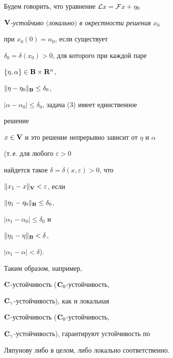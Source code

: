\begin{defn}


Будем говорить, что уравнение ${\cal L}x={\cal F}x+\eta_0$\;


{\it $\bold {V}$-устойчиво $($локально$)$ в окрестности решения $x_0$}


при $x_0(0)=\alpha_0$, если существует


$\delta_0=\delta(x_0)>0$, для которого при каждой паре


$\{\eta,\alpha\}\in\bold {B}\times\bold {R}^n$,


$\|\eta-\eta_0\|_{\bold B}\le\delta_0$,


$|\alpha-\alpha_0|\le\delta_0$, задача (3) имеет единственное


решение


$x\in\bold {V}$ и это решение непрерывно зависит от $\eta$ и $\alpha$


(т.\,е. для любого $\varepsilon>0$


найдется такое $\delta=\delta(x,\varepsilon)>0$, что


$\|x_1-x\|_{\bold V}<\varepsilon$, если


$\|\eta_1-\eta_0\|_{\bold B}\le\delta_0$,


$|\alpha_1-\alpha_0|\le\delta_0$ и


$\|\eta_1-\eta\|_{\bold B}<\delta$,


$|\alpha_1-\alpha|<\delta$).


\end{defn}





\begin{note}


Таким образом, например,


$\bold {C}$-устойчивость ($\bold {C}_0$-устойчивость,


$\bold {C}_\gamma$-устой\-чи\-вость), как и локальная


$\bold {C}$-устойчивость ($\bold {C}_0$-устойчивость,


$\bold {C}_\gamma$-устойчивость), гарантируют устойчивость по


Ляпунову либо в целом, либо локально соответственно.


\end{note}





